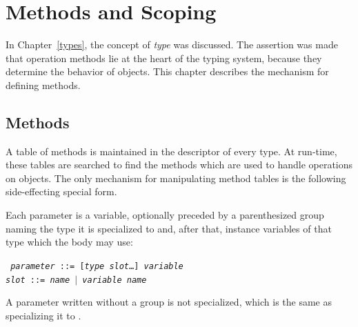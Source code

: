 %
%
%


\chapter{Methods and Scoping} \label{methods}

In Chapter~\ref{types}, the concept of \emph{type} was discussed.
The assertion was made that operation methods lie at the heart of the
typing system, because they determine the behavior of objects.  This
chapter describes the mechanism for defining methods.

\section{Methods}

A table of methods is maintained in the descriptor of every type. At
run-time, these tables are searched to find the methods which are used
to handle operations on objects. The only mechanism for manipulating
method tables is the following side-effecting special form.


Each parameter is a variable, optionally preceded by a parenthesized
group naming the type it is specialized to and, after that, instance
variables of that type which the body may use:
\begin{flushleft}\tt
\emph{parameter} ::= [\lpar\emph{type} \emph{slot}\ldots\rpar] \emph{variable}\\
\emph{slot} ::= \emph{name} $|$ \lpar\emph{variable} \emph{name}\rpar
\end{flushleft}
A parameter written without a group is not specialized, which is the
same as specializing it to .

